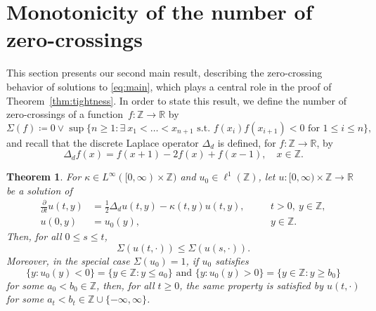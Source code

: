\documentclass[12pt,reqno,oneside]{amsart}
\numberwithin{equation}{section}
\newtheorem{theorem}{Theorem}[section]
\theoremstyle{definition}
\theoremstyle{remark}
\newcommand{\R}{\mathbb{R}}
\newcommand{\Z}{\mathbb{Z}}
\begin{document}
\section{Monotonicity of the number of zero-crossings}
\label{sec:model}

This section presents our second main result, describing the zero-crossing
behavior of solutions to \eqref{eq:main}, which plays a central role in the
proof of Theorem~\ref{thm:tightness}. In order to state this result, we
define the number of zero-crossings of a function~$f : \Z \rightarrow \R$  by
\begin{equation*}
  \Sigma(f) \coloneq 0 \vee \sup\{ n \geq 1: \exists \ x_1<  \dots < x_{n+1}
    \text{ s.t. } f(x_i)f(x_{i+1})<0 \text{ for } 1 \leq i \leq n \},
\end{equation*}
and recall that the discrete Laplace operator $\Delta_d$ is
defined, for $f: \Z \rightarrow \R$, by
\begin{equation*}
    \Delta_d f(x)=f(x+1)-2f(x)+f(x-1), \quad  x \in \Z.
\end{equation*}

\begin{theorem}
  \label{Thm:zero-crossings}
    For $\kappa \in L^\infty([0,\infty) \times \Z)$ and $u_0 \in \ell^1(\Z)$,
    let $u: [0,\infty) \times \Z \rightarrow \R$ be a solution of
    \begin{equation}
      \label{eq:main_2}
      \begin{aligned}
        \frac{\partial}{\partial t} u(t,y) &
        = \frac{1}{2} \Delta_d u(t,y) - \kappa(t,y)u(t,y), \quad
        &&t > 0, \ y \in \Z,
        \\ u(0,y)&=u_0(y),
        &&y \in \Z.
      \end{aligned}
    \end{equation}
    Then, for all  $0 \leq s \leq t$,
    \begin{equation}
      \label{eq:u_t_vs_u_s}
      \Sigma(u(t,\cdot)) \leq \Sigma(u(s,\cdot)).
    \end{equation}
    Moreover, in the special case  $\Sigma(u_0)= 1$,
    if $u_0$ satisfies
    \begin{equation} \label{eq:cond_u_0}
      \{y : u_0(y)<0\} = \{y \in \Z: y \leq a_0\}
      \text{ and }
      \{y : u_0(y)>0\} = \{y \in \Z: y \geq b_0\}
    \end{equation}
    for some $a_0<b_0 \in \Z$, then, for all $t \geq 0$, the same property is
    satisfied by $u(t,\cdot)$ for some
    $a_t<b_t \in \Z \cup \{-\infty, \infty\}$.
\end{theorem}
\end{document}
